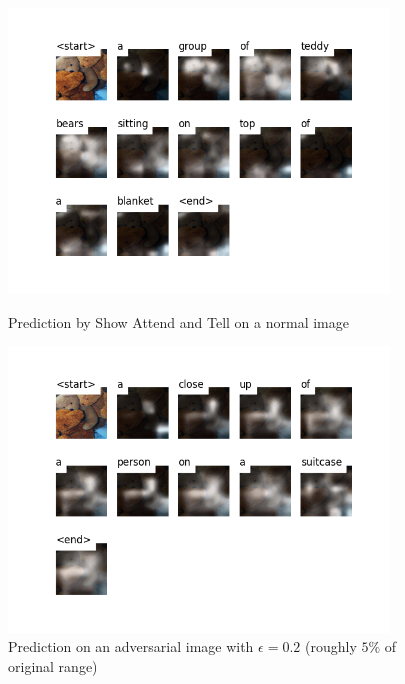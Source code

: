 \begin{figure}
    \centering
    \begin{minipage}{0.45\textwidth}
        \centering
        \includegraphics[width=0.9\textwidth]{figures/caption_teddy_normal.png} %
        \caption{Prediction by Show Attend and Tell on a normal image}
    \end{minipage}\hfill
    \begin{minipage}{0.45\textwidth}
        \centering
        \includegraphics[width=0.9\textwidth]{figures/caption_teddy_adversarial_0.2.png} %
        \caption{Prediction on an adversarial image with $\epsilon=0.2$ (roughly $5\%$ of original range)}
    \end{minipage}
\end{figure}

